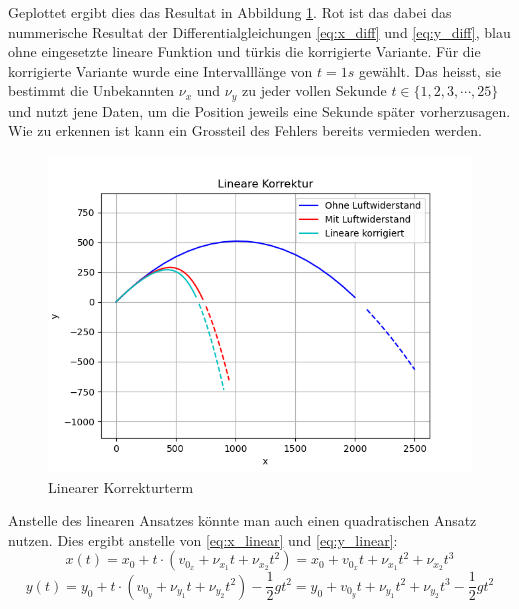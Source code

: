 Geplottet ergibt dies das Resultat in Abbildung \ref{naive_linear_term}. Rot ist das dabei das nummerische Resultat der Differentialgleichungen \ref{eq:x_diff} und \ref{eq:y_diff}, blau ohne eingesetzte lineare Funktion und türkis die korrigierte Variante. Für die korrigierte Variante wurde eine Intervalllänge von $t=1s$ gewählt. Das heisst, sie bestimmt die Unbekannten $\nu_x$ und $\nu_y$ zu jeder vollen Sekunde $t \in \{1, 2, 3, \cdots, 25\}$ und nutzt jene Daten, um die Position jeweils eine Sekunde später vorherzusagen. Wie zu erkennen ist kann ein Grossteil des Fehlers bereits vermieden werden.
\begin{figure}
    \centering
    \includegraphics[scale=0.7]{papers/perturbation/bilder/img1.png}
    \caption{Linearer Korrekturterm}
	\label{naive_linear_term}
\end{figure}


Anstelle des linearen Ansatzes könnte man auch einen quadratischen Ansatz nutzen. Dies ergibt anstelle von \ref{eq:x_linear} und \ref{eq:y_linear}:
\begin{equation}
    x(t) = x_0 + t \cdot (v_{0_x} + \nu_{x_1}t + \nu_{x_2}t^2) = x_0 + v_{0_x}t + \nu_{x_1}t^2 + \nu_{x_2}t^3
\end{equation}
\begin{equation}
    y(t) = y_0 + t \cdot (v_{0_y} + \nu_{y_1}t + \nu_{y_2}t^2) - \frac{1}{2}gt^2 = y_0 + v_{0_y}t + \nu_{y_1}t^2 + \nu_{y_2}t^3 - \frac{1}{2}gt^2
\end{equation}

